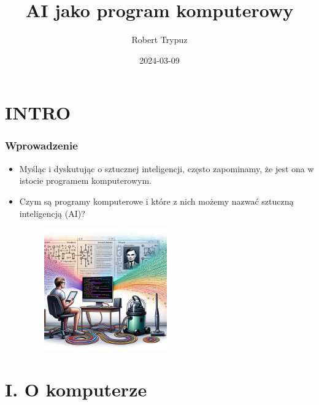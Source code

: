 \documentclass{beamer}
\title{AI jako program komputerowy}
\author{Robert Trypuz}
\institute{AI po lekcjach}
\date{2024-03-09}
\begin{document}
\frame{\titlepage}
  

\section{INTRO}

\begin{frame}[fragile]
\frametitle{Wprowadzenie}
 \begin{itemize}
\item Myśląc i dyskutując o sztucznej inteligencji, często zapominamy, że jest ona w istocie programem komputerowym.
\item Czym są programy komputerowe i które z nich możemy nazwać sztuczną inteligencją (AI)? 

                    \begin{figure}[h]
                        \centering
                        \includegraphics[width=0.5\textwidth]{../../img/o_komputerze.png}
                    \end{figure}                    
                    \end{itemize}

\end{frame}

\section{I. O komputerze}
\end{document}
